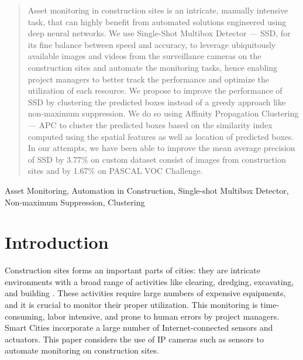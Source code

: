\documentclass[conference]{IEEEtran}
\begin{document}
\maketitle
\let\thefootnote\relax{}
\begin{abstract}
Asset monitoring in construction sites is an intricate, manually intensive task, that can highly benefit from automated solutions engineered using deep neural networks. We use Single-Shot Multibox Detector --- SSD, for its fine balance between speed and accuracy, to leverage ubiquitously available images and videos from the surveillance cameras on the construction sites and automate the monitoring tasks, hence enabling project managers to better track the performance and optimize the utilization of each resource. We propose to improve the performance of SSD by clustering the predicted boxes instead of a greedy approach like non-maximum suppression. We do so using Affinity Propagation Clustering --- APC to cluster the predicted boxes based on the similarity index computed using the spatial features as well as location of predicted boxes. In our attempts, we have been able to improve the mean average precision of SSD by 3.77\% on custom dataset consist of images from construction sites and by 1.67\% on PASCAL VOC Challenge. 
\end{abstract}

\begin{IEEEkeywords}
Asset Monitoring, Automation in Construction, Single-shot Multibox Detector, Non-maximum Suppression, Clustering
\end{IEEEkeywords}
\section{Introduction}
Construction sites forms an important parts of cities: they are intricate environments with a broad range of activities like clearing, dredging, excavating, and building \cite{batty2012smart}. 
These activities require large numbers of expensive equipments, and it is crucial to monitor their proper utilization. This monitoring is time-consuming, labor intensive, and prone to human errors by project managers. Smart Cities incorporate a large number of Internet-connected sensors and actuators. This paper considers the use of IP cameras such as sensors to automate monitoring on construction sites.  
\end{document}
